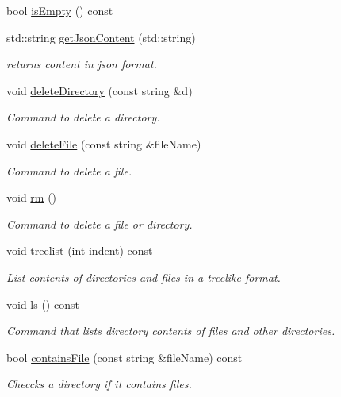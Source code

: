 \begin{DoxyCompactItemize}
bool \hyperlink{class_directory_a5d3efa22fedc9f37963b2217e60beb3c}{is\+Empty} () const
\item 
std\+::string \hyperlink{class_directory_ad4b9f8d48a33526ac1c61dbce3753f1d}{get\+Json\+Content} (std\+::string)
\begin{DoxyCompactList}\small\item\em returns content in json format. \end{DoxyCompactList}\item 
void \hyperlink{class_directory_a8d233286b4964b8261543fa823e66f9e}{delete\+Directory} (const string \&d)
\begin{DoxyCompactList}\small\item\em Command to delete a directory. \end{DoxyCompactList}\item 
void \hyperlink{class_directory_ac5d2847c135eff94ce4fedd8099de18a}{delete\+File} (const string \&file\+Name)
\begin{DoxyCompactList}\small\item\em Command to delete a file. \end{DoxyCompactList}\item 
void \hyperlink{class_directory_ad764e9b4d0568c0acf788a15e0621f1a}{rm} ()
\begin{DoxyCompactList}\small\item\em Command to delete a file or directory. \end{DoxyCompactList}\item 
void \hyperlink{class_directory_af21c038562a88b24df0cb6e0c361febd}{treelist} (int indent) const
\begin{DoxyCompactList}\small\item\em List contents of directories and files in a treelike format. \end{DoxyCompactList}\item 
void \hyperlink{class_directory_a97bf31f9a554ff687a410f735d8770dd}{ls} () const
\begin{DoxyCompactList}\small\item\em Command that lists directory contents of files and other directories. \end{DoxyCompactList}\item 
bool \hyperlink{class_directory_a0286ef72f0d7cd5a0be7c15c0db46942}{contains\+File} (const string \&file\+Name) const
\begin{DoxyCompactList}\small\item\em Checcks a directory if it contains files. \end{DoxyCompactList}\item 

\end{DoxyCompactItemize}

